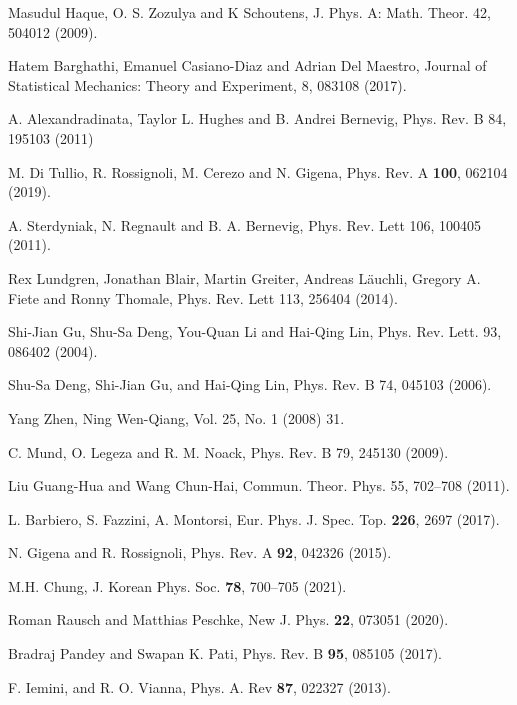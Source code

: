 \documentclass[prb,reprint,showpacs,twocolumn,superscriptaddress]{revtex4-2}
\begin{document}
\begin{thebibliography}{99}
 Masudul Haque, O. S. Zozulya and K Schoutens,
J. Phys. A: Math. Theor. 42, 504012 (2009).

 Hatem Barghathi, Emanuel Casiano-Diaz and Adrian Del Maestro,
Journal of Statistical Mechanics: Theory and Experiment, 
8, 083108 (2017).

 A. Alexandradinata, Taylor L. Hughes and B. Andrei Bernevig, Phys. Rev. B 84, 195103 (2011)

  M. Di Tullio, R. Rossignoli, M. Cerezo and N. Gigena, Phys. Rev. A \textbf{100}, 062104 (2019).

 A. Sterdyniak, N. Regnault and B. A. Bernevig,
Phys. Rev. Lett 106, 100405 (2011).

 Rex Lundgren, Jonathan Blair, Martin Greiter, Andreas Läuchli, Gregory A. Fiete and Ronny Thomale,
Phys. Rev. Lett 113, 256404 (2014).



 Shi-Jian Gu, Shu-Sa Deng, You-Quan Li and Hai-Qing Lin,
Phys. Rev. Lett. 93, 086402 (2004).

 Shu-Sa Deng, Shi-Jian Gu, and Hai-Qing Lin, Phys. Rev. B 74, 045103 (2006).

 Yang Zhen, Ning Wen-Qiang,
Vol. 25, No. 1 (2008) 31.

 C. Mund, O. Legeza and R. M. Noack, 
Phys. Rev. B 79, 245130 (2009).

 Liu Guang-Hua and Wang Chun-Hai,
Commun. Theor. Phys. 55, 702–708 (2011).

  L. Barbiero, S. Fazzini, A. Montorsi, Eur. Phys. J. Spec. Top. \textbf{226}, 2697 (2017). 

 N. Gigena and R. Rossignoli, 
Phys. Rev. A \textbf{92}, 042326 (2015).

  M.H. Chung, J. Korean Phys. Soc. \textbf{78}, 700–705 (2021).

  Roman Rausch and Matthias Peschke,
 New J. Phys. \textbf{22}, 073051 (2020).

  Bradraj Pandey and Swapan K. Pati, 
 Phys. Rev. B \textbf{95}, 085105 (2017).
 
 

 F. Iemini,  and R. O. Vianna, Phys. A. Rev
\textbf{87}, 022327 (2013).


\end{thebibliography}
\end{document}
